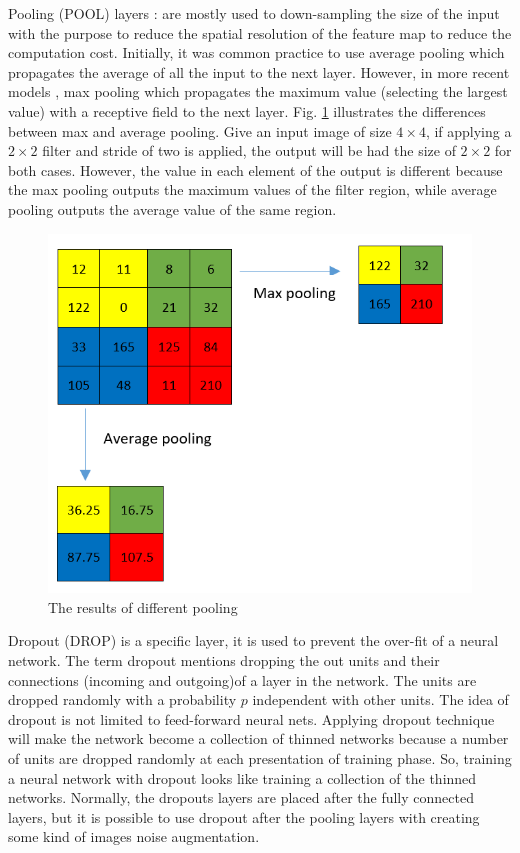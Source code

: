 \documentclass[review]{elsarticle}
\begin{document}
Pooling (POOL) layers : are mostly used to down-sampling the size of the input with the purpose to reduce the spatial resolution of the feature map to reduce the computation cost. Initially, it was common practice to use average pooling which propagates the average of all the input to the next layer. However, in more recent models \cite{krizhevsky2012imagenet, ciregan2012multi, li2015convolutional}, max pooling which propagates the maximum value (selecting the largest value) with a receptive field to the next layer. Fig. \ref{imgcnn_pooling} illustrates the differences between max and average pooling. Give an input image of size $4 \times 4$, if applying a $2 \times 2$ filter and stride of two is applied, the output will be had the size of $2 \times 2$ for both cases. However, the value in each element of the output is different because the max pooling outputs the maximum values of the filter region, while average pooling outputs the average value of the same region.

\begin{figure}[!h]
	\centering
	\includegraphics[scale=.5]{images/pooling}
	\caption{The results of different pooling}
	\label{imgcnn_pooling}
\end{figure}

Dropout (DROP) \cite{srivastava2014dropout} is a specific layer, it is used to prevent the over-fit of a neural network.
The term dropout mentions dropping the out units and their connections (incoming and outgoing)of a layer in the network. The units are dropped randomly with a probability $p$ independent with other units. The idea of dropout is not limited to feed-forward neural nets. Applying dropout technique will make the network become a collection of thinned networks because a number of units are dropped randomly at each presentation of training phase. So, training a neural network with dropout looks like training a collection of the thinned networks. Normally, the dropouts layers are placed after the fully connected layers, but it is possible to use dropout after the pooling layers with creating some kind of images noise augmentation.
\end{document}
